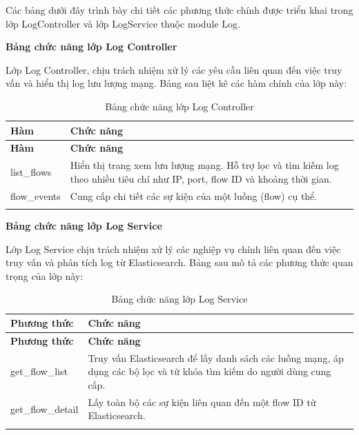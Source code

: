 \documentclass[../DoAn.tex]{subfiles}
\begin{document}
Các bảng dưới đây trình bày chi tiết các phương thức chính được triển khai trong lớp LogController và lớp LogService thuộc module Log.

\textbf{Bảng chức năng lớp Log Controller}

Lớp Log Controller, chịu trách nhiệm xử lý các yêu cầu liên quan đến việc truy vấn và hiển thị log lưu lượng mạng. Bảng sau liệt kê các hàm chính của lớp này:

\begin{longtable}{|p{5cm}|p{9cm}|}
\hline
\textbf{Hàm} & \textbf{Chức năng} \\ \hline
\endfirsthead

\hline
\textbf{Hàm} & \textbf{Chức năng} \\ \hline
\endhead

list\_flows & Hiển thị trang xem lưu lượng mạng. Hỗ trợ lọc và tìm kiếm log theo nhiều tiêu chí như IP, port, flow ID và khoảng thời gian. \\ \hline
flow\_events & Cung cấp chi tiết các sự kiện của một luồng (flow) cụ thể. \\ \hline

\caption{Bảng chức năng lớp Log Controller} \label{table:log-controller} \\
\end{longtable}

\vspace{0.5cm}

\textbf{Bảng chức năng lớp Log Service}

Lớp Log Service chịu trách nhiệm xử lý các nghiệp vụ chính liên quan đến việc truy vấn và phân tích log từ Elasticsearch. Bảng sau mô tả các phương thức quan trọng của lớp này:

\begin{longtable}{|p{5cm}|p{9cm}|}
\hline
\textbf{Phương thức} & \textbf{Chức năng} \\ \hline
\endfirsthead

\hline
\textbf{Phương thức} & \textbf{Chức năng} \\ \hline
\endhead

get\_flow\_list & Truy vấn Elasticsearch để lấy danh sách các luồng mạng, áp dụng các bộ lọc và từ khóa tìm kiếm do người dùng cung cấp. \\ \hline
get\_flow\_detail & Lấy toàn bộ các sự kiện liên quan đến một flow ID từ Elasticsearch. \\ \hline

\caption{Bảng chức năng lớp Log Service} \label{table:log-service} \\
\end{longtable}
\end{document}

